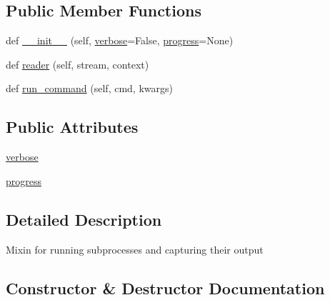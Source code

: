 \subsection*{Public Member Functions}
\begin{DoxyCompactItemize}
\item 
def \hyperlink{classpip_1_1__vendor_1_1distlib_1_1util_1_1SubprocessMixin_ac5d6392448f5b2c0c7f361b2ad1a3ef5}{\+\_\+\+\_\+init\+\_\+\+\_\+} (self, \hyperlink{classpip_1_1__vendor_1_1distlib_1_1util_1_1SubprocessMixin_a156b87b23af3fc0fabc8be99f8225071}{verbose}=False, \hyperlink{classpip_1_1__vendor_1_1distlib_1_1util_1_1SubprocessMixin_a13998eb5b6ec65a810026d1a666e54ea}{progress}=None)
\item 
def \hyperlink{classpip_1_1__vendor_1_1distlib_1_1util_1_1SubprocessMixin_adb0a6a1e7c5baca35688b4f61445fe12}{reader} (self, stream, context)
\item 
def \hyperlink{classpip_1_1__vendor_1_1distlib_1_1util_1_1SubprocessMixin_a4d3767b94e3194eba1bd0a805ef5a193}{run\+\_\+command} (self, cmd, kwargs)
\end{DoxyCompactItemize}
\subsection*{Public Attributes}
\begin{DoxyCompactItemize}
\item 
\hyperlink{classpip_1_1__vendor_1_1distlib_1_1util_1_1SubprocessMixin_a156b87b23af3fc0fabc8be99f8225071}{verbose}
\item 
\hyperlink{classpip_1_1__vendor_1_1distlib_1_1util_1_1SubprocessMixin_a13998eb5b6ec65a810026d1a666e54ea}{progress}
\end{DoxyCompactItemize}


\subsection{Detailed Description}
\begin{DoxyVerb}Mixin for running subprocesses and capturing their output
\end{DoxyVerb}
 

\subsection{Constructor \& Destructor Documentation}
\mbox{\label{classpip_1_1__vendor_1_1distlib_1_1util_1_1SubprocessMixin_ac5d6392448f5b2c0c7f361b2ad1a3ef5}} 
